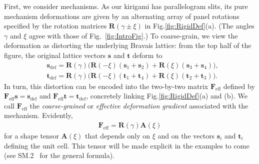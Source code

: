 \documentclass[aps,prl,twocolumn,superscriptaddress]{revtex4-1}
\begin{document}
First, we consider mechanisms. As our kirigami has parallelogram slits, its pure mechanism deformations are given by an alternating array of panel rotations specified by the  rotation matrices $\mathbf{R}(\gamma \pm\xi)$ in Fig.\;\ref{fig:RigidDef}(a). 
(The angles $\gamma$ and $\xi$ agree with those of Fig.~\ref{fig:IntroFig}.) %
To coarse-grain, we view the deformation as distorting the underlying Bravais lattice: from the top half of the figure, the original lattice vectors $\mathbf{s}$ and $\mathbf{t}$ deform to 
\begin{equation}
\begin{aligned}\label{eq:defBravais}
&\mathbf{s}_{\text{def}} = \mathbf{R}(\gamma) \big( \mathbf{R}(-\xi)  (\mathbf{s}_{1} + \mathbf{s}_2) + \mathbf{R}(\xi) ( \mathbf{s}_{3} + \mathbf{s}_4) \big),\\
&\mathbf{t}_{\text{def}} = \mathbf{R}(\gamma) \big( \mathbf{R}(-\xi)  (\mathbf{t}_{1} + \mathbf{t}_4) + \mathbf{R}(\xi)  (\mathbf{t}_{2} + \mathbf{t}_3) \big).
\end{aligned}
\end{equation}
In turn, this distortion can be encoded into the two-by-two matrix $\mathbf{F}_\text{eff}$ defined by $\mathbf{F}_{\text{eff}} \mathbf{s} = \mathbf{s}_{\text{def}}$ and $\mathbf{F}_{\text{eff}} \mathbf{t} = \mathbf{t}_{\text{def}}$, concretely linking Fig.\;\ref{fig:RigidDef}(a) and (b). We call $\mathbf{F}_\text{eff}$ the \textit{coarse-grained} or \textit{effective deformation gradient} associated with the mechanism. Evidently,
\begin{equation}
\begin{aligned}\label{eq:Feff}
\mathbf{F}_{\text{eff}} = \mathbf{R}(\gamma) \mathbf{A}(\xi)
\end{aligned}
\end{equation}
for a shape tensor $\mathbf{A}(\xi)$ that depends only on $\xi$ and on the vectors $\mathbf{s}_i$ and $\mathbf{t}_i$ defining the unit cell. This tensor will be made explicit in the examples to come (see SM.2~\cite{suppl} for the general formula).
\end{document}
